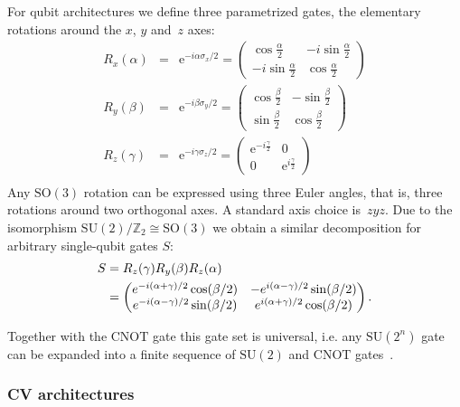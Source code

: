 \documentclass[aps,pra,10pt,twocolumn,groupedaddress,nofootinbib]{revtex4-1}
\theoremstyle{plain}
\newcommand{\isom}{\cong} %
\newcommand{\bpm}{\begin{pmatrix}}
\newcommand{\epm}{\end{pmatrix}}
\newcommand{\Z}{\ensuremath{\mathbb Z}}  %
\newcommand{\SO}{\text{SO}} %
\newcommand{\SU}{\text{SU}} %
\newcommand{\CNOT}{\text{CNOT}}
\newcommand{\e}{\mathrm{e}}
\begin{document}
For qubit architectures we define three parametrized gates,
the elementary rotations around the $x$, $y$ and~$z$ axes:
\begin{eqnarray*}
        R_x(\alpha) &=& \e^{-i\alpha \sigma_x/2} =
        \begin{pmatrix}
          \cos \frac{\alpha}{2} & -i \sin \frac{\alpha}{2}\\
          -i \sin \frac{\alpha}{2} & \cos \frac{\alpha}{2}
        \end{pmatrix}\\
        R_y(\beta) &=& \e^{-i\beta \sigma_y/2} =
        \begin{pmatrix}
          \cos \frac{\beta}{2} & -\sin \frac{\beta}{2}\\
          \sin \frac{\beta}{2} & \cos \frac{\beta}{2}
        \end{pmatrix}\\
        R_z(\gamma) &=& \e^{-i\gamma \sigma_z/2}=
        \begin{pmatrix}
          \e^{-i \frac{\gamma}{2}} & 0\\
          0 & \e^{i \frac{\gamma}{2}}
        \end{pmatrix}\\
\end{eqnarray*}
Any $\SO(3)$ rotation can be expressed using three Euler angles, that is, three rotations around two orthogonal axes. A standard axis choice is~$zyz$. Due to the isomorphism $\SU(2)/\Z_2 \isom \SO(3)$ we obtain a similar decomposition
for arbitrary single-qubit gates $S$:
\begin{align}
\label{eq:app:euler}
\notag
S &= R_z(\gamma) R_y(\beta) R_z(\alpha)\\
&=
\bpm
e^{-i(\alpha+\gamma)/2} \cos(\beta/2) & -e^{i(\alpha-\gamma)/2} \sin(\beta/2)\\
e^{-i(\alpha-\gamma)/2} \sin(\beta/2) &  e^{i(\alpha+\gamma)/2} \cos(\beta/2)
\epm.
\end{align}

Together with the $\CNOT$ gate this gate set is universal, i.e. any $\SU(2^n)$
gate can be expanded into a finite sequence of $\SU(2)$ and $\CNOT$ gates~\cite{barenco1995}.

\subsubsection{CV architectures}
\end{document}
